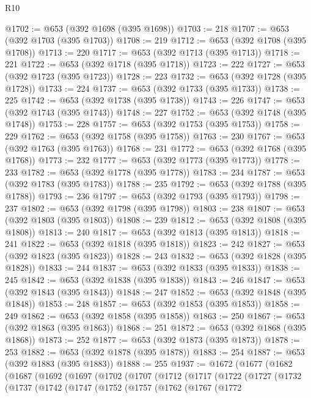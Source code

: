 \begin{lexlean}{R10}
\begin{coremodule}
@1702 := @653 (@392 @1698 (@395 @1698))
@1703 := 218
@1707 := @653 (@392 @1703 (@395 @1703))
@1708 := 219
@1712 := @653 (@392 @1708 (@395 @1708))
@1713 := 220
@1717 := @653 (@392 @1713 (@395 @1713))
@1718 := 221
@1722 := @653 (@392 @1718 (@395 @1718))
@1723 := 222
@1727 := @653 (@392 @1723 (@395 @1723))
@1728 := 223
@1732 := @653 (@392 @1728 (@395 @1728))
@1733 := 224
@1737 := @653 (@392 @1733 (@395 @1733))
@1738 := 225
@1742 := @653 (@392 @1738 (@395 @1738))
@1743 := 226
@1747 := @653 (@392 @1743 (@395 @1743))
@1748 := 227
@1752 := @653 (@392 @1748 (@395 @1748))
@1753 := 228
@1757 := @653 (@392 @1753 (@395 @1753))
@1758 := 229
@1762 := @653 (@392 @1758 (@395 @1758))
@1763 := 230
@1767 := @653 (@392 @1763 (@395 @1763))
@1768 := 231
@1772 := @653 (@392 @1768 (@395 @1768))
@1773 := 232
@1777 := @653 (@392 @1773 (@395 @1773))
@1778 := 233
@1782 := @653 (@392 @1778 (@395 @1778))
@1783 := 234
@1787 := @653 (@392 @1783 (@395 @1783))
@1788 := 235
@1792 := @653 (@392 @1788 (@395 @1788))
@1793 := 236
@1797 := @653 (@392 @1793 (@395 @1793))
@1798 := 237
@1802 := @653 (@392 @1798 (@395 @1798))
@1803 := 238
@1807 := @653 (@392 @1803 (@395 @1803))
@1808 := 239
@1812 := @653 (@392 @1808 (@395 @1808))
@1813 := 240
@1817 := @653 (@392 @1813 (@395 @1813))
@1818 := 241
@1822 := @653 (@392 @1818 (@395 @1818))
@1823 := 242
@1827 := @653 (@392 @1823 (@395 @1823))
@1828 := 243
@1832 := @653 (@392 @1828 (@395 @1828))
@1833 := 244
@1837 := @653 (@392 @1833 (@395 @1833))
@1838 := 245
@1842 := @653 (@392 @1838 (@395 @1838))
@1843 := 246
@1847 := @653 (@392 @1843 (@395 @1843))
@1848 := 247
@1852 := @653 (@392 @1848 (@395 @1848))
@1853 := 248
@1857 := @653 (@392 @1853 (@395 @1853))
@1858 := 249
@1862 := @653 (@392 @1858 (@395 @1858))
@1863 := 250
@1867 := @653 (@392 @1863 (@395 @1863))
@1868 := 251
@1872 := @653 (@392 @1868 (@395 @1868))
@1873 := 252
@1877 := @653 (@392 @1873 (@395 @1873))
@1878 := 253
@1882 := @653 (@392 @1878 (@395 @1878))
@1883 := 254
@1887 := @653 (@392 @1883 (@395 @1883))
@1888 := 255
@1937 := @1672
    (@1677
      (@1682
        (@1687
          (@1692
            (@1697
              (@1702
                (@1707
                  (@1712
                    (@1717
                      (@1722
                        (@1727
                          (@1732
                            (@1737
                              (@1742
                                (@1747
                                  (@1752
                                    (@1757
                                      (@1762
                                        (@1767
                                          (@1772

\end{coremodule}
\end{lexlean}

